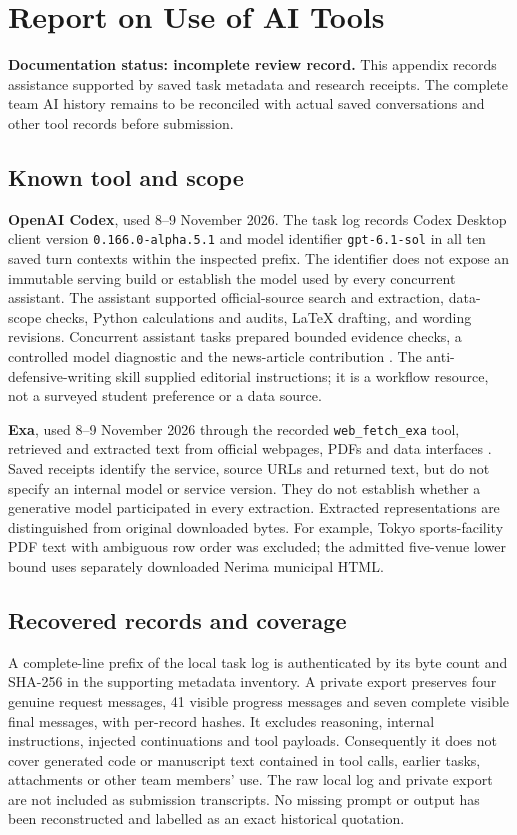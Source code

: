 \section*{Report on Use of AI Tools}
\textbf{Documentation status: incomplete review record.}
This appendix records assistance supported by saved task metadata and research
receipts. The complete team AI history remains to be reconciled with actual
saved conversations and other tool records before submission.

\subsection*{Known tool and scope}
\textbf{OpenAI Codex}, used 8--9 November 2026. The task log records Codex
Desktop client version \texttt{0.166.0-alpha.5.1} and model identifier
\texttt{gpt-6.1-sol} in all ten saved turn contexts within the inspected prefix.
The identifier does not expose an immutable serving build or establish the
model used by every concurrent assistant. The assistant supported official-source
search and extraction, data-scope checks, Python calculations and audits,
LaTeX drafting, and wording revisions. Concurrent assistant tasks prepared
bounded evidence checks, a controlled model diagnostic and the news-article
contribution \cite{openai}. The anti-defensive-writing skill supplied editorial instructions;
it is a workflow resource, not a surveyed student preference or a data source.

\textbf{Exa}, used 8--9 November 2026 through the recorded
\texttt{web\_fetch\_exa} tool, retrieved and extracted text from official
webpages, PDFs and data interfaces \cite{exa}. Saved receipts identify the
service, source URLs and returned text, but do not specify an internal model
or service version. They do not establish whether a generative model
participated in every extraction. Extracted representations are distinguished
from original downloaded bytes. For example, Tokyo sports-facility PDF text
with ambiguous row order was excluded; the admitted five-venue lower bound
uses separately downloaded Nerima municipal HTML.

\clearpage
\subsection*{Recovered records and coverage}
A complete-line prefix of the local task log is authenticated by its byte count
and SHA-256 in the supporting metadata inventory. A private export preserves
four genuine request messages, 41 visible progress messages and seven complete
visible final messages, with per-record hashes. It excludes reasoning, internal
instructions, injected continuations and tool payloads. Consequently it does
not cover generated code or manuscript text contained in tool calls, earlier
tasks, attachments or other team members' use. The raw local log and private
export are not included as submission transcripts. No missing prompt or output
has been reconstructed and labelled as an exact historical quotation.

